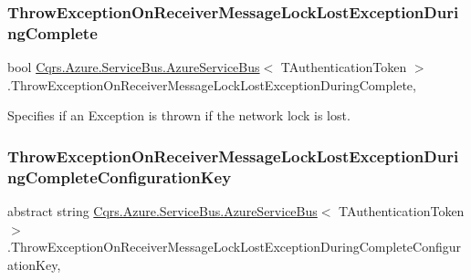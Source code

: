 \subsubsection{\texorpdfstring{Throw\+Exception\+On\+Receiver\+Message\+Lock\+Lost\+Exception\+During\+Complete}{ThrowExceptionOnReceiverMessageLockLostExceptionDuringComplete}}
{\footnotesize\ttfamily bool \hyperlink{classCqrs_1_1Azure_1_1ServiceBus_1_1AzureServiceBus}{Cqrs.\+Azure.\+Service\+Bus.\+Azure\+Service\+Bus}$<$ T\+Authentication\+Token $>$.Throw\+Exception\+On\+Receiver\+Message\+Lock\+Lost\+Exception\+During\+Complete\hspace{0.3cm}{\ttfamily [get]}, {\ttfamily [protected]}}



Specifies if an Exception is thrown if the network lock is lost. 

\mbox{\label{classCqrs_1_1Azure_1_1ServiceBus_1_1AzureServiceBus_a29a4fb4d6f85c649e699cd5e7f0b4d1d_a29a4fb4d6f85c649e699cd5e7f0b4d1d}} 
\subsubsection{\texorpdfstring{Throw\+Exception\+On\+Receiver\+Message\+Lock\+Lost\+Exception\+During\+Complete\+Configuration\+Key}{ThrowExceptionOnReceiverMessageLockLostExceptionDuringCompleteConfigurationKey}}
{\footnotesize\ttfamily abstract string \hyperlink{classCqrs_1_1Azure_1_1ServiceBus_1_1AzureServiceBus}{Cqrs.\+Azure.\+Service\+Bus.\+Azure\+Service\+Bus}$<$ T\+Authentication\+Token $>$.Throw\+Exception\+On\+Receiver\+Message\+Lock\+Lost\+Exception\+During\+Complete\+Configuration\+Key\hspace{0.3cm}{\ttfamily [get]}, {\ttfamily [protected]}}



